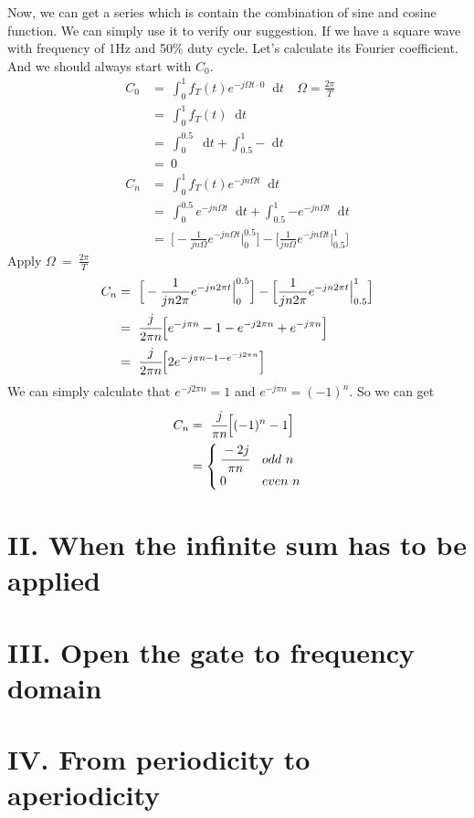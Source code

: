 \documentclass[margin,line]{res}
\newcommand*{\dif}{\mathop{}\!\mathrm{d}}
\begin{document}
\begin{resume}
Now, we can get a series which is contain the combination of sine and cosine function. We can simply use it to verify our suggestion. If we have a square wave with frequency of 1Hz and 50\% duty cycle. Let's calculate its Fourier coefficient. And we should always start with $C_0$.
\begin{align}
C_0 &= \ \int_{0}^{1}{f_T(t) e^{-j\Omega t \cdot 0} \dif t} \quad \Omega=\frac{2\pi}{T} \nonumber \\
	&=\ \int_{0}^{1}{f_T(t) \dif t} \nonumber \\
	&=\ \int_{0}^{0.5}{\dif t} + \int_{0.5}^{1}{- \dif t} \nonumber \\
	&=\ 0 \nonumber \\
C_n &= \ \int_{0}^{1}{ f_T(t) e^{-jn\Omega t} \dif t} \nonumber \\
	&= \ \int_{0}^{0.5}{e^{-jn\Omega t} \dif t} +
		 \int_{0.5}^{1}{-e^{-jn\Omega t} \dif t} \nonumber \\
	&= \ \Big[-\frac{1}{jn\Omega} e^{-jn\Omega t}\Big|_{0}^{0.5} \Big] -
	   	 \Big[\frac{1}{jn\Omega} e^{-jn\Omega t}\Big|_{0.5}^{1} \Big] \nonumber
\end{align}
Apply $\Omega \ = \ \frac{2\pi}{T} $
\begin{align}
C_n	&= \ \Big[-\frac{1}{jn2\pi} e^{-jn2\pi t}\Big|_{0}^{0.5} \Big] -
		 \Big[\frac{1}{jn2\pi} e^{-jn2\pi t}\Big|_{0.5}^{1} \Big] \nonumber \\
	&= \ \cfrac{j}{2\pi n}\Big[ e^{-j\pi n} -1 -e^{-j2\pi n} +e^{-j\pi n} \Big] \nonumber \\
	&= \ \cfrac{j}{2\pi n}\Big[ 2e^{-j\pi n -1 -e^{-j2\pi n}} \Big] \nonumber
\end{align}
We can simply calculate that $e^{-j2\pi n}=1$ and $e^{-j\pi n}=(-1)^{n}$. So we can get
\begin{align}
C_n &= \ \cfrac{j}{\pi n}\Big[ (-1)^n-1 \Big] \nonumber \\
	&=\begin{cases}
		\cfrac{-2j}{\pi n}&  {odd \ n} \\
		0&  {even \ n}
 	  \end{cases}	\nonumber
\end{align}
\begin{figure}[H]
	\centerline{}
\end{figure}
\clearpage

\section{\sc II. When the infinite sum has to be applied}
\clearpage

\section{\sc III. Open the gate to frequency domain}
\clearpage

\section{\sc IV. From periodicity to aperiodicity}
\clearpage

\end{resume}
\end{document}
